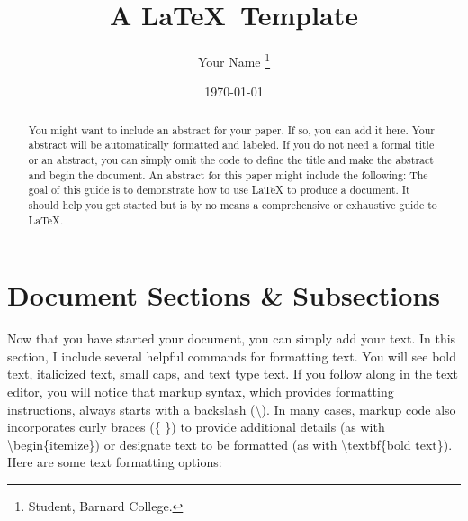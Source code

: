 \documentclass[12pt,notitlepage]{article}		%
\title{A \LaTeX\  Template}								%
\author{Your Name 										%
\footnote{Student, Barnard College.}}				%
\date{\today}											%
\begin{document}
\maketitle			%

\begin{abstract}
You might want to include an abstract for your paper.  If so, you can add it here.  Your abstract will be automatically formatted and labeled.  If you do not need a formal title or an abstract, you can simply omit the code to define the title  and make the abstract and begin the document.  An abstract for this paper might include the following:  The goal of this guide is to demonstrate how to use LaTeX to produce a document.  It should help you get started but is by no means a comprehensive or exhaustive guide to LaTeX.
\end{abstract}

 \clearpage
 





\section{Document Sections \& Subsections}			%

\doublespacing

Now that you have started your document, you can simply add your text.  In this section, I include several helpful commands for formatting text.  You will see bold text, italicized text, small caps, and text type text.  If you follow along in the text editor, you will notice that markup syntax, which provides formatting instructions, always starts with a backslash (\textbackslash).  In many cases, markup code also incorporates curly braces (\{ \}) to provide additional details (as with \textbackslash begin\{itemize\}) or designate text to be formatted (as with \textbackslash textbf\{bold text\}).
Here are some text formatting options:
\end{document}
